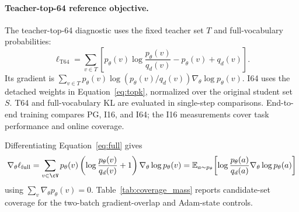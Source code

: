 \paragraph{Teacher-top-64 reference objective.}
The teacher-top-64 diagnostic uses the fixed teacher set $T$ and full-vocabulary probabilities:
\begin{equation}
\ell_{\mathrm{T64}}=\sum_{v\in T}\left[p_\theta(v)\log\frac{p_\theta(v)}{q_d(v)}-p_\theta(v)+q_d(v)\right].
\label{eq:t64}
\end{equation}
Its gradient is $\sum_{v\in T}p_\theta(v)\log(p_\theta(v)/q_d(v))\nabla_\theta\log p_\theta(v)$. I64 uses the detached weights in Equation~\ref{eq:topk}, normalized over the original student set $S$. T64 and full-vocabulary KL are evaluated in single-step comparisons. End-to-end training compares PG, I16, and I64; the I16 measurements cover task performance and online coverage.

Differentiating Equation~\ref{eq:full} gives
\begin{align}
\nabla_\theta\ell_{\mathrm{full}}
=\sum_{v\in\cV}p_\theta(v)\left(\log\frac{p_\theta(v)}{q_d(v)}+1\right)\nabla_\theta\log p_\theta(v)
=\mathbb E_{a\sim p_\theta}\!\left[\log\frac{p_\theta(a)}{q_d(a)}\nabla_\theta\log p_\theta(a)\right]
\end{align}
using $\sum_v\nabla_\theta p_\theta(v)=0$. Table~\ref{tab:coverage_mass} reports candidate-set coverage for the two-batch gradient-overlap and Adam-state controls.

\begin{table}[t]
\caption{\textbf{The teacher top-64 set captures nearly all student probability mass in these controls.} Means over sampled prefixes; gradient norms use domain-specific inputs. Entropy is in nats, and 100\% may reflect rounding.}
\label{tab:coverage_mass}
\centering\small

\end{table}


